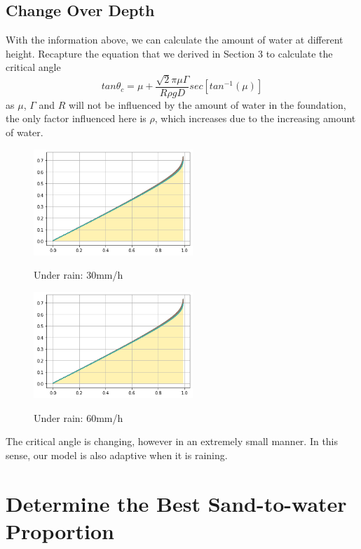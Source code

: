 \documentclass[12pt]{article}
\begin{document}
\subsection{Change Over Depth}
With the information above, we can calculate the amount of water at different height. Recapture the equation that we derived in Section 3 to calculate the critical angle
$$ tan\theta_c = \mu + \frac{\sqrt{2}\pi\mu\Gamma}{R\rho gD}sec[tan^{-1}(\mu)] $$
as $\mu$, $\Gamma$ and $R$ will not be influenced by the amount of water in the foundation, the only factor influenced here is $\rho$, which increases due to the increasing amount of water.
\begin{figure}[H]
	\centering
	\caption{Under rain: 30mm/h}
	\includegraphics[width=6cm, height = 4.2cm\linewidth]{rain1.png}
	\label{fig:result}
\end{figure}
\begin{figure}[H]
	\centering
	\caption{Under rain: 60mm/h}
	\includegraphics[width=6cm, height = 4.2cm\linewidth]{rain2.png}
	\label{fig:result}
\end{figure}
The critical angle is changing, however in an extremely small manner. In this sense, our model is also adaptive when it is raining. 

\section{Determine the Best Sand-to-water Proportion}
\end{document}
